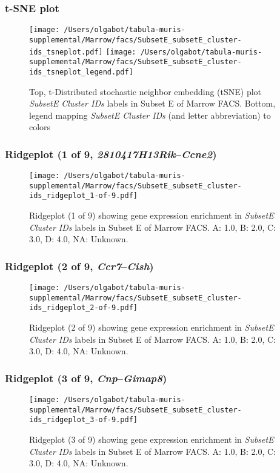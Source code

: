 \clearpage
\subsubsection{t-SNE plot}
\begin{figure}[h]
\centering
\texttt{[image: /Users/olgabot/tabula-muris-supplemental/Marrow/facs/SubsetE\_subsetE\_cluster-ids\_tsneplot.pdf]}
\texttt{[image: /Users/olgabot/tabula-muris-supplemental/Marrow/facs/SubsetE\_subsetE\_cluster-ids\_tsneplot\_legend.pdf]}
\caption{Top, t-Distributed stochastic neighbor embedding (tSNE) plot  \emph{SubsetE Cluster IDs} labels in Subset E of Marrow FACS. Bottom, legend mapping \emph{SubsetE Cluster IDs} (and letter abbreviation) to colors}
\end{figure}


\clearpage

\subsubsection{Ridgeplot (1 of 9, \emph{2810417H13Rik}--\emph{Ccne2})}
\begin{figure}[h]
\centering
\texttt{[image: /Users/olgabot/tabula-muris-supplemental/Marrow/facs/SubsetE\_subsetE\_cluster-ids\_ridgeplot\_1-of-9.pdf]}

\caption{ Ridgeplot (1 of 9)  showing gene expression enrichment in \emph{SubsetE Cluster IDs} labels in Subset E of Marrow FACS. A: 1.0, B: 2.0, C: 3.0, D: 4.0, NA: Unknown.}
\end{figure}


\clearpage

\subsubsection{Ridgeplot (2 of 9, \emph{Ccr7}--\emph{Cish})}
\begin{figure}[h]
\centering
\texttt{[image: /Users/olgabot/tabula-muris-supplemental/Marrow/facs/SubsetE\_subsetE\_cluster-ids\_ridgeplot\_2-of-9.pdf]}

\caption{ Ridgeplot (2 of 9)  showing gene expression enrichment in \emph{SubsetE Cluster IDs} labels in Subset E of Marrow FACS. A: 1.0, B: 2.0, C: 3.0, D: 4.0, NA: Unknown.}
\end{figure}


\clearpage

\subsubsection{Ridgeplot (3 of 9, \emph{Cnp}--\emph{Gimap8})}
\begin{figure}[h]
\centering
\texttt{[image: /Users/olgabot/tabula-muris-supplemental/Marrow/facs/SubsetE\_subsetE\_cluster-ids\_ridgeplot\_3-of-9.pdf]}

\caption{ Ridgeplot (3 of 9)  showing gene expression enrichment in \emph{SubsetE Cluster IDs} labels in Subset E of Marrow FACS. A: 1.0, B: 2.0, C: 3.0, D: 4.0, NA: Unknown.}
\end{figure}


